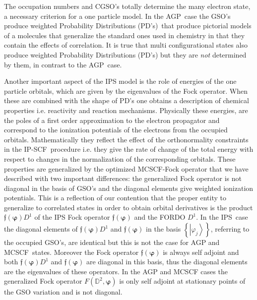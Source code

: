 \documentclass[aps,preprint]{revtex4}%
\begin{document}
The occupation numbers and CGSO's totally determine the many electron state, a
necessary criterion for a one particle model. In the AGP\ case the GSO's
produce weighted Probability Distributions (PD's)\ that produce pictorial
models of a molecules that generalize the standard ones used in chemistry in
that they contain the effects of correlation. It is true that multi
configurational states also produce weighted Probability Distributions (PD's)
but they are \emph{not} determined by them, in contrast to the AGP\ case.

Another important aspect of the IPS model is the role of energies of the one
particle orbitals, which are given by the eigenvalues of the Fock operator.
When these are combined with the shape of PD's one obtains a description of
chemical properties i.e. reactivity and reaction mechanisms. Physically these
energies, are the poles of a first order approximation to the electron
propagator and correspond to the ionization potentials of the electrons from
the occupied orbitals. Mathematically they reflect the effect of the
orthonormality constraints in the IP-SCF\ procedure i.e. they give the rate of
change of the total energy with respect to changes in the normalization of the
corresponding orbitals. These properties are generalized by the optimized
MCSCF-Fock operator that we have described with two important differences: the
generalized Fock operator is not diagonal in the basis of GSO's and the
diagonal elements give weighted ionization potentials. This is a reflection of
our contention that the proper entity to generalize to correlated states in
order to obtain orbital derivatives is the product $\mathfrak{f}\left(
\bm{\varphi}\right)  D^{1}$ of the IPS Fock operator $\mathfrak{f}\left(
\bm{\varphi}\right)  $ and the FORDO $D^{1}$. In the IPS\ case the diagonal
elements of $\mathfrak{f}\left(  \bm{\varphi}\right)  D^{1}$ and
$\mathfrak{f}\left(  \bm{\varphi}\right)  $ in the basis $\left\{  \left\vert
\varphi_{j}\right\rangle \right\}  $, referring to the occupied GSO's, are
identical but this is not the case for AGP and MCSCF\ states. Moreover the
Fock operator $\mathfrak{f}\left(  \bm{\varphi}\right)  $ is always self
adjoint and both $\mathfrak{f}\left(  \bm{\varphi}\right)  D^{1}$ and
$\mathfrak{f}\left(  \bm{\varphi}\right)  $ are diagonal in this basis, thus
the diagonal elements are the eigenvalues of these operators. In the AGP and
MCSCF cases the generalized Fock operator $F\left(  \mathbb{D}^{2}%
,\bm{\varphi}\right)  $ is only self adjoint at stationary points of the GSO
variation and is not diagonal.
\end{document}
